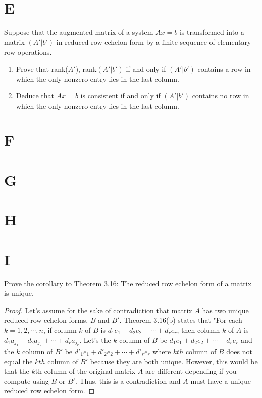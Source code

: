 \documentclass[11pt]{scrartcl}
\begin{document}
\section{E}
Suppose that the augmented matrix of a system $Ax = b$ is transformed into a matrix $(A'|b')$ in reduced row
echelon form by a finite sequence of elementary row operations.
\begin{enumerate}[label=\alph*.]
	\item{
		Prove that rank($A'$), rank$(A'|b')$ if and only if $(A'|b')$ contains a row in which the only nonzero entry lies
		in the last column.

	}
	\item{
		Deduce that $Ax = b$ is consistent if and only if $(A'|b')$ contains no row in which the only nonzero entry lies
		in the last column.
	}
\end{enumerate}


\section{F}

\section{G}

\section{H} 

\section{I} 
Prove the corollary to Theorem 3.16: The reduced row echelon form of a matrix is unique.
\begin{proof}
Let's assume for the sake of contradiction that matrix $A$ has two unique reduced row echelon forms, $B$ and $B'$.
Theorem 3.16(b) states that "For each $k = 1, 2, \cdots, n$, if column $k$ of $B$ is $d_1e_1 + d_2e_2 + \cdots + d_re_r $, 
then column $k$ of $A$ is $d_1a_{j_1} + d_2a_{j_2} + \cdots + d_ra_{j_r}$. Let's the $k$ column of $B$ be $d_1e_1 + d_2e_2 + \cdots + d_re_r$
and the $k$ column of $B'$ be $d'_1e_1 + d'_2e_2 + \cdots + d'_re_r$ where $kth$ column of $B$ does not equal the $kth$ column of $B'$ because they are both unique.
However, this would be that the $k$th column of the original matrix $A$ are different depending if you compute using $B$ or $B'$. Thus, this is a contradiction
and $A$ must have a unique reduced row echelon form. 
\end{proof}
\end{document}
